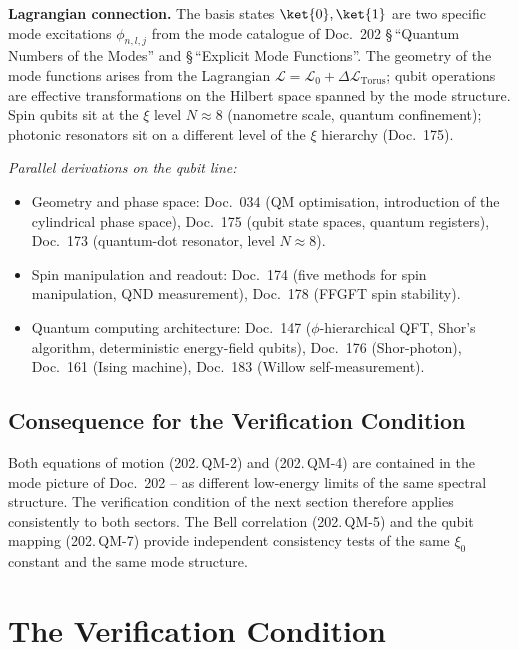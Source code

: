 \textbf{Lagrangian connection.} The basis states $\ket{0}, \ket{1}$
are two specific mode excitations $\phi_{n,l,j}$ from the mode
catalogue of Doc.~202 \S\,\enquote{Quantum Numbers of the Modes}
and \S\,\enquote{Explicit Mode Functions}. The geometry of the mode
functions arises from the Lagrangian
$\mathcal{L} = \mathcal{L}_0 + \Delta\mathcal{L}_{\text{Torus}}$;
qubit operations are effective transformations on the Hilbert space
spanned by the mode structure. Spin qubits sit at the $\xi$ level
$N \approx 8$ (nanometre scale, quantum confinement); photonic
resonators sit on a different level of the $\xi$ hierarchy
(Doc.~175).

\textit{Parallel derivations on the qubit line:}
\begin{itemize}\setlength\itemsep{0pt}
  \item Geometry and phase space:
        Doc.~034 (QM optimisation, introduction of the cylindrical
        phase space),
        Doc.~175 (qubit state spaces, quantum registers),
        Doc.~173 (quantum-dot resonator, level $N \approx 8$).
  \item Spin manipulation and readout:
        Doc.~174 (five methods for spin manipulation, QND
        measurement),
        Doc.~178 (FFGFT spin stability).
  \item Quantum computing architecture:
        Doc.~147 ($\phi$-hierarchical QFT, Shor's algorithm,
        deterministic energy-field qubits),
        Doc.~176 (Shor-photon),
        Doc.~161 (Ising machine),
        Doc.~183 (Willow self-measurement).
\end{itemize}

\subsection*{Consequence for the Verification Condition}

Both equations of motion (202.\,QM-2) and (202.\,QM-4) are contained
in the mode picture of Doc.~202 -- as different low-energy limits of
the same spectral structure. The verification condition of the next
section therefore applies consistently to both sectors. The Bell
correlation (202.\,QM-5) and the qubit mapping (202.\,QM-7) provide
independent consistency tests of the same $\xi_0$ constant and the
same mode structure.

\section{The Verification Condition}

